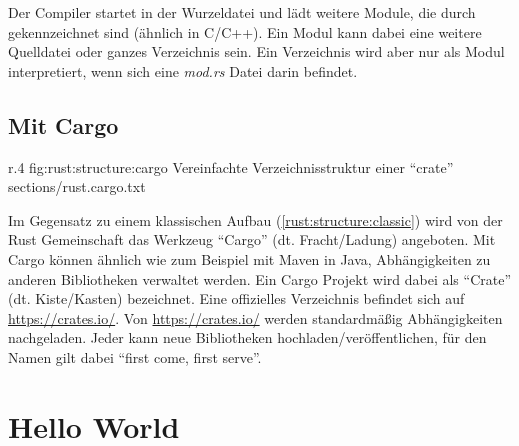 Der Compiler startet in der Wurzeldatei und lädt weitere Module, die durch  gekennzeichnet sind (ähnlich  in C/C++).
Ein Modul kann dabei eine weitere Quelldatei oder ganzes Verzeichnis sein.
Ein Verzeichnis wird aber nur als Modul interpretiert, wenn sich eine \textit{mod.rs} Datei darin befindet.

\subsection{Mit Cargo}
\label{rust:structure:cargo}

\begin{wrapfigure}{r}{.4\textwidth}
	\rustcincludeml
		{fig:rust:structure:cargo}
		{Vereinfachte Verzeichnisstruktur einer \enquote{crate}}
		{sections/rust.cargo.txt}
\end{wrapfigure}



Im Gegensatz zu einem klassischen Aufbau (\autoref{rust:structure:classic}) wird von der Rust Gemeinschaft das Werkzeug \enquote{Cargo} (dt. Fracht/Ladung) angeboten.
Mit Cargo können ähnlich wie zum Beispiel mit Maven  in Java, Abhängigkeiten zu anderen Bibliotheken verwaltet werden.
Ein Cargo Projekt wird dabei als \enquote{Crate} (dt. Kiste/Kasten) bezeichnet.
Eine offizielles Verzeichnis befindet sich auf \url{https://crates.io/}.
Von \url{https://crates.io/} werden standardmäßig Abhängigkeiten nachgeladen.
Jeder kann neue Bibliotheken hochladen/veröffentlichen, für den Namen gilt dabei \enquote{first come, first serve}.








\section{Hello World}


